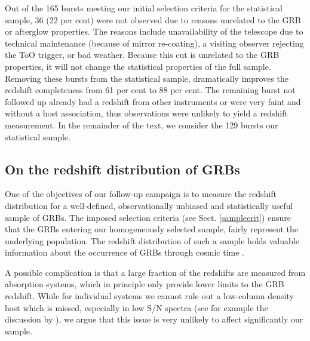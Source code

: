 \documentclass[longauth]{aa}    %
\begin{document}
Out of the 165 bursts meeting our initial selection criteria for the statistical
sample, 36 (22 per cent) were not observed due to reasons unrelated to the GRB
or afterglow properties. The reasons include unavailability of the telescope due
to technical maintenance (because of mirror re-coating), a visiting observer
rejecting the ToO trigger, or bad weather. Because this cut is unrelated to the
GRB properties, it will not change the statistical properties of the full
sample. Removing these bursts from the statistical sample, dramatically improves
the redshift completeness from 61 per cent to 88 per cent. The remaining burst
not followed up already had a redshift from other instruments or were very faint
and without a host association, thus observations were unlikely to yield a redshift
measurement. In the remainder of the text, we consider the 129 bursts our
statistical sample.

\subsection{On the redshift distribution of GRBs} \label{redshift}

One of the objectives of our follow-up campaign is to measure the redshift
distribution for a well-defined, observationally unbiased and statistically useful
sample of GRBs. The imposed selection criteria (see Sect. \ref{samplecrit})
ensure that the GRBs entering our homogeneously selected sample, fairly represent the
underlying population. The redshift distribution of such a sample holds valuable
information about the occurrence of GRBs through cosmic time
\citep{Jakobsson2012, Perley2016a}.

A possible complication is that a large fraction of the redshifts are 
measured from absorption systems, which in principle only provide lower 
limits to the GRB redshift. While for individual systems we cannot rule 
out a low-column density host which is missed, especially in low S/N 
spectra (see for example the discussion by 
\citealt{2008ApJ...688..470P, Perley2017a}), we argue that this issue is very 
unlikely to affect significantly our sample. 
\end{document}
